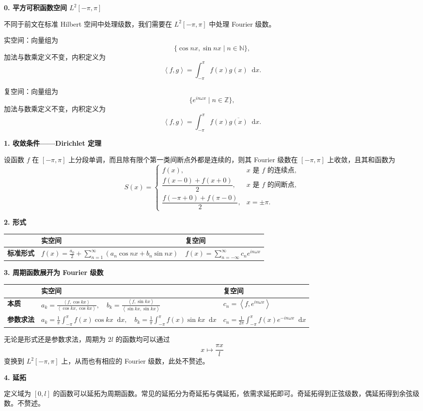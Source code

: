 \documentclass[UTF8,fontset=fandol,zihao=5]{ctexart}
\newcommand{\N}{\mathbb{N}}
\newcommand{\dd}{\mathop{}\!\mathrm{d}}
\newcommand{\inner}[2]{\left\langle#1,#2\right\rangle}
\begin{document}
\textbf{0. 平方可积函数空间 $L^2[-\pi,\pi]$}

不同于前文在标准 Hilbert 空间中处理级数，我们需要在 $L^2[-\pi,\pi]$ 中处理 Fourier 级数。

实空间：向量组为
\[
\{\cos nx,\sin nx\mid n\in\N\},
\]
加法与数乘定义不变，内积定义为
\[
\inner fg=\int_{-\pi}^{\pi}f(x)g(x)\dd x.
\]

复空间：向量组为
\[
\{e^{in\omega x}\mid n\in\mathbb Z\},
\]
加法与数乘定义不变，内积定义为
\[
\inner fg=\int_{-\pi}^{\pi}f(x)\overline{g(x)}\dd x.
\]

\textbf{1. 收敛条件——Dirichlet 定理}

设函数 $f$ 在 $[-\pi,\pi]$ 上分段单调，而且除有限个第一类间断点外都是连续的，则其 Fourier 级数在 $[-\pi,\pi]$ 上收敛，且其和函数为
\[
S(x)=
\begin{cases}
f(x),&x\text{ 是 }f\text{ 的连续点},\\[3pt]
\dfrac{f(x-0)+f(x+0)}{2},&x\text{ 是 }f\text{ 的间断点},\\[7pt]
\dfrac{f(-\pi+0)+f(\pi-0)}{2},&x=\pm\pi.
\end{cases}
\]

\textbf{2. 形式}

\begin{center}
\begin{tabularx}{\textwidth}{>{\bfseries}p{2.3cm}XX}
\toprule
 & 实空间 & 复空间 \\
\midrule
标准形式 & $\displaystyle f(x)=\frac{a_0}{2}+\sum_{n=1}^{\infty}(a_n\cos nx+b_n\sin nx)$ & $\displaystyle f(x)=\sum_{n=-\infty}^{\infty}c_ne^{in\omega x}$ \\
\bottomrule
\end{tabularx}
\end{center}

\textbf{3. 周期函数展开为 Fourier 级数}

\begin{center}
\begin{tabularx}{\textwidth}{>{\bfseries}p{2.3cm}XX}
\toprule
 & 实空间 & 复空间 \\
\midrule
本质 & $\displaystyle a_k=\frac{\inner{f}{\cos kx}}{\inner{\cos kx}{\cos kx}},\quad b_k=\frac{\inner{f}{\sin kx}}{\inner{\sin kx}{\sin kx}}$ & $c_n=\inner{f}{e^{in\omega x}}$ \\
参数求法 & $\displaystyle a_k=\frac1\pi\int_{-\pi}^{\pi}f(x)\cos kx\dd x,\quad b_k=\frac1\pi\int_{-\pi}^{\pi}f(x)\sin kx\dd x$ & $\displaystyle c_n=\frac1{2\pi}\int_{-\pi}^{\pi}f(x)e^{-in\omega x}\dd x$ \\
\bottomrule
\end{tabularx}
\end{center}

无论是形式还是参数求法，周期为 $2l$ 的函数均可以通过
\[
x\mapsto\frac{\pi x}{l}
\]
变换到 $L^2[-\pi,\pi]$ 上，从而也有相应的 Fourier 级数，此处不赘述。

\textbf{4. 延拓}

定义域为 $[0,l]$ 的函数可以延拓为周期函数。常见的延拓分为奇延拓与偶延拓，依需求延拓即可。奇延拓得到正弦级数，偶延拓得到余弦级数。不赘述。
\end{document}
